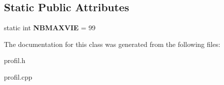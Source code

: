 \subsection*{Static Public Attributes}
\begin{DoxyCompactItemize}
\item 
\hypertarget{class_profil_a0b2e757f8408a36260136e1e2033557e}{}static int {\bfseries N\+B\+M\+A\+X\+V\+I\+E} = 99\label{class_profil_a0b2e757f8408a36260136e1e2033557e}

\end{DoxyCompactItemize}


The documentation for this class was generated from the following files\+:\begin{DoxyCompactItemize}
\item 
profil.\+h\item 
profil.\+cpp\end{DoxyCompactItemize}
